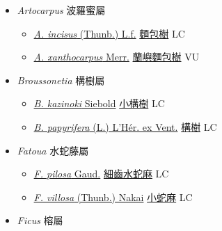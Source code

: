 
  \begin{itemize}
 \item[] \textit{Artocarpus} 波羅蜜屬
                    
  \begin{itemize}
        \item[] \href{http://www.theplantlist.org/tpl1.1/search?q=Artocarpus+incisus}{\textit{A. incisus} (Thunb.) L.f.}   \href{\detokenize{http://taibnet.sinica.edu.tw/chi/taibnet_species_list.php?T2=麵包樹&T2_new_value=true&fr=y}}{麵包樹} LC
        \item[] \href{http://www.theplantlist.org/tpl1.1/search?q=Artocarpus+xanthocarpus}{\textit{A. xanthocarpus} Merr.}   \href{\detokenize{http://taibnet.sinica.edu.tw/chi/taibnet_species_list.php?T2=蘭嶼麵包樹&T2_new_value=true&fr=y}}{蘭嶼麵包樹} VU
  \end{itemize}
 \item[] \textit{Broussonetia} 構樹屬
                    
  \begin{itemize}
        \item[] \href{http://www.theplantlist.org/tpl1.1/search?q=Broussonetia+kazinoki}{\textit{B. kazinoki} Siebold}   \href{\detokenize{http://taibnet.sinica.edu.tw/chi/taibnet_species_list.php?T2=小構樹&T2_new_value=true&fr=y}}{小構樹} LC
        \item[] \href{http://www.theplantlist.org/tpl1.1/search?q=Broussonetia+papyrifera}{\textit{B. papyrifera} (L.) L'Hér. ex Vent.}   \href{\detokenize{http://taibnet.sinica.edu.tw/chi/taibnet_species_list.php?T2=構樹&T2_new_value=true&fr=y}}{構樹} LC
  \end{itemize}
 \item[] \textit{Fatoua} 水蛇藤屬
                    
  \begin{itemize}
        \item[] \href{http://www.theplantlist.org/tpl1.1/search?q=Fatoua+pilosa}{\textit{F. pilosa} Gaud.}   \href{\detokenize{http://taibnet.sinica.edu.tw/chi/taibnet_species_list.php?T2=細齒水蛇麻&T2_new_value=true&fr=y}}{細齒水蛇麻} LC
        \item[] \href{http://www.theplantlist.org/tpl1.1/search?q=Fatoua+villosa}{\textit{F. villosa} (Thunb.) Nakai}   \href{\detokenize{http://taibnet.sinica.edu.tw/chi/taibnet_species_list.php?T2=小蛇麻&T2_new_value=true&fr=y}}{小蛇麻} LC
  \end{itemize}
 \item[] \textit{Ficus} 榕屬
                    

\end{itemize}
